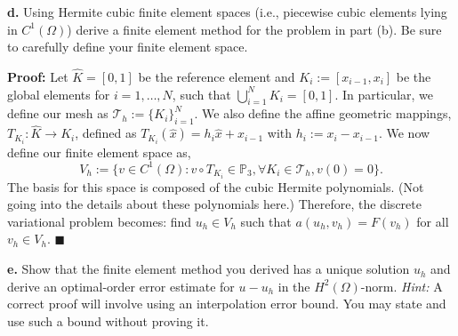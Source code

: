 \documentclass[11pt]{article}
\begin{document}
\textbf{d.} Using Hermite cubic finite element spaces (i.e., piecewise cubic elements lying in $C^1(\Omega)$) derive a finite element method for the problem in part (b).
Be sure to carefully define your finite element space.

\vskip 1cm


\textbf{Proof:} Let $\widehat{K} = [0,1]$ be the reference element and $K_i := [x_{i-1},x_i]$ be the global elements for $i = 1, \ldots, N$, such that $\bigcup_{i=1}^N K_i = [0,1]$. 
In particular, we define our mesh as $\mathcal{T}_h := \{ K_i \}_{i=1}^N$.
We also define the affine geometric mappings, $T_{K_i} : \widehat{K} \to K_i$, defined as $T_{K_i}(\hat{x}) = h_i \hat{x} + x_{i-1}$ with $h_i := x_i - x_{i-1}$.
We now define our finite element space as,
\begin{equation}
	V_h := \{ v \in C^1(\Omega) : v\circ T_{K_i} \in \mathbb{P}_3, \forall K_i \in \mathcal{T}_h, v(0) = 0 \}.
\end{equation}
The basis for this space is composed of the cubic Hermite polynomials.
(Not going into the details about these polynomials here.)
Therefore, the discrete variational problem becomes: find $u_h \in V_h$ such that $a(u_h,v_h) = F(v_h)$ for all $v_h \in V_h$.
$\blacksquare$




\vskip 2cm

{\bf e.} Show that the finite element method you derived has a unique solution $u_h$ and derive an optimal-order error estimate for $u - u_h$ in the $H^2(\Omega)$-norm. {\it Hint:} A correct proof will involve using an interpolation error bound. You may state and use such a bound without proving it.
\\[8pt]
\end{document}
